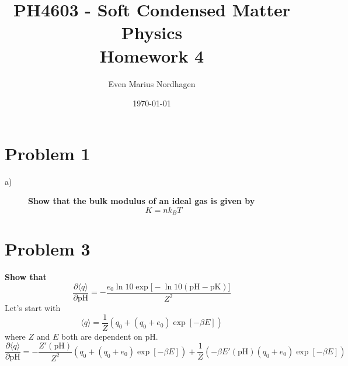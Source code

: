 \documentclass[norsk,a4paper,12pt]{article}
\title{PH4603 - Soft Condensed Matter Physics\\\vspace{2mm} \Large{Homework 4}}
\author{\large Even Marius Nordhagen}
\date\today
\begin{document}
\maketitle

\section*{Problem 1}
\begin{description}
\item [a)] \textbf{Show that the bulk modulus of an ideal gas is given by}
\begin{equation}
K=nk_BT
\end{equation}
\end{description}

\section*{Problem 3}
\textbf{Show that}
\begin{equation}
\frac{\partial \langle q\rangle}{\partial \text{pH}}=-\frac{e_0\ln10\exp\Big[-\ln10(\text{pH}-\text{pK})\Big]}{Z^2}
\end{equation}
Let's start with
\begin{equation}
\langle q\rangle = \frac{1}{Z}(q_0+(q_0+e_0)\exp[-\beta E])
\end{equation}
where $Z$ and $E$ both are dependent on pH. 
$$\frac{\partial\langle q\rangle}{\partial \text{pH}}=-\frac{Z'(\text{pH})}{Z^2}(q_0+(q_0+e_0)\exp[-\beta E])+\frac{1}{Z}(-\beta E'(\text{pH})(q_0+e_0)\exp[-\beta E])$$ 
\end{document}
